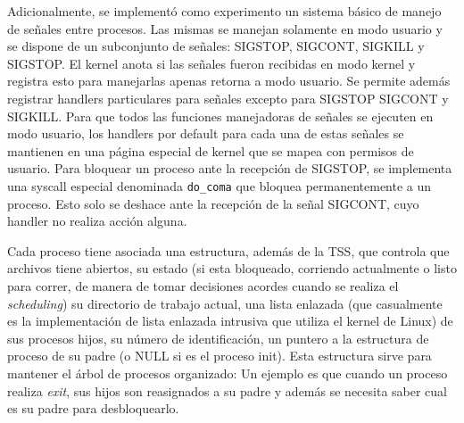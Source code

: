 Adicionalmente, se implement\'o como experimento un sistema b\'asico de manejo de se\~nales entre procesos. Las mismas se manejan solamente
en modo usuario y se dispone de un subconjunto de se\~nales: SIGSTOP, SIGCONT, SIGKILL y SIGSTOP. El kernel anota si las se\~nales fueron
recibidas en modo kernel y registra esto para manejarlas apenas retorna a modo usuario. Se permite adem\'as registrar handlers particulares
para se\~nales excepto para SIGSTOP SIGCONT y SIGKILL. 
Para que todos las funciones manejadoras de se\~nales se ejecuten en modo usuario, los handlers por default para cada una de estas se\~nales
se mantienen en una p\'agina especial de kernel que se mapea con permisos de usuario. Para bloquear un proceso ante la recepci\'on de
SIGSTOP, se implementa una syscall especial denominada \texttt{do\_coma} que bloquea permanentemente a un proceso. Esto solo se deshace ante
la recepci\'on de la se\~nal SIGCONT, cuyo handler no realiza acci\'on alguna. 

Cada proceso tiene asociada una estructura, adem\'as de la TSS, que controla que archivos tiene abiertos, su estado (si esta bloqueado, corriendo
actualmente o listo para correr, de manera de tomar decisiones acordes cuando se realiza el \textit{scheduling}) su directorio
de trabajo actual, una lista enlazada (que casualmente es la implementaci\'on de lista enlazada intrusiva que utiliza el kernel de Linux)
de sus procesos hijos, su n\'umero de identificaci\'on, un puntero a la estructura de proceso de su padre (o NULL si es el proceso init).
Esta estructura sirve para mantener el \'arbol de procesos organizado: Un ejemplo es que cuando un proceso realiza \textit{exit}, sus hijos
son reasignados a su padre y adem\'as se necesita saber cual es su padre para desbloquearlo.
